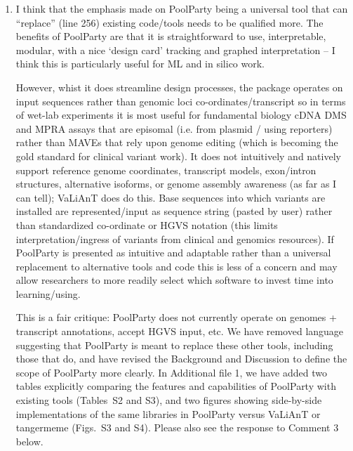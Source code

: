 \documentclass[11pt]{article}
\newenvironment{response}{\par\color{responseblue}}{\par}
\newenvironment{msquote}
  {\begin{quote}\color{responseblue}\itshape\noindent\ignorespaces}
  {\end{quote}}
\begin{document}
\begin{enumerate}
\item I think that the emphasis made on PoolParty being a universal tool that
can ``replace'' (line 256) existing code/tools needs to be qualified more. The
benefits of PoolParty are that it is straightforward to use, interpretable,
modular, with a nice `design card' tracking and graphed interpretation -- I
think this is particularly useful for ML and in silico work.

However, whist it does streamline design processes, the package operates on
input sequences rather than genomic loci co-ordinates/transcript so in terms of
wet-lab experiments it is most useful for fundamental biology cDNA DMS and MPRA
assays that are episomal (i.e. from plasmid / using reporters) rather than MAVEs
that rely upon genome editing (which is becoming the gold standard for clinical
variant work). It does not intuitively and natively support reference genome
coordinates, transcript models, exon/intron structures, alternative isoforms,
or genome assembly awareness (as far as I can tell); VaLiAnT does do this. Base
sequences into which variants are installed are represented/input as sequence
string (pasted by user) rather than standardized co-ordinate or HGVS notation
(this limits interpretation/ingress of variants from clinical and genomics
resources). If PoolParty is presented as intuitive and adaptable rather than a
universal replacement to alternative tools and code this is less of a concern
and may allow researchers to more readily select which software to invest time
into learning/using.

\begin{response}
This is a fair critique: PoolParty does not currently operate on genomes + transcript annotations, accept HGVS input, etc. We have removed language suggesting that PoolParty is meant to replace these other tools, including those that do, and have revised the Background and Discussion to define the scope of PoolParty more clearly. In Additional file 1, we have added two tables explicitly comparing the features and capabilities of PoolParty with existing tools (Tables~S2 and S3), and two figures showing side-by-side implementations of the same libraries in PoolParty versus VaLiAnT or tangermeme (Figs.~S3 and S4). Please also see the response to Comment 3 below.  
\end{response}



\end{enumerate}
\end{document}
